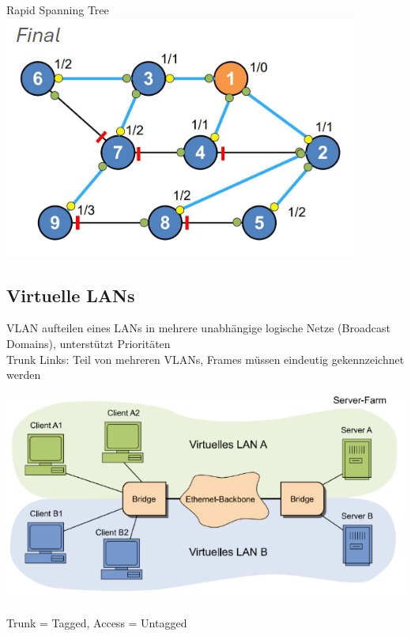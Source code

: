 \begin{example2}[breakable]{Rapid Spanning Tree}
    \includegraphics[width=1\linewidth]{images/rapid_spanning_tree3.png}
\end{example2}

\columnbreak

\subsection{Virtuelle LANs}

\begin{definition}{VLAN}
    aufteilen eines LANs in mehrere unabhängige logische Netze (Broadcast Domains), unterstützt Prioritäten\\
    Trunk Links: Teil von mehreren VLANs, Frames müssen eindeutig gekennzeichnet werden\\
    \begin{center}
        \includegraphics[width=0.8\linewidth]{images/vlan.png}\\
    \end{center}
    Trunk = Tagged, Access = Untagged
\end{definition}

